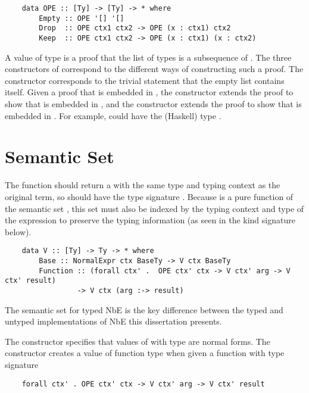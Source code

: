 \begin{lstlisting}
    data OPE :: [Ty] -> [Ty] -> * where
        Empty :: OPE '[] '[]
        Drop  :: OPE ctx1 ctx2 -> OPE (x : ctx1) ctx2
        Keep  :: OPE ctx1 ctx2 -> OPE (x : ctx1) (x : ctx2)
\end{lstlisting}

A value of type  is a proof that the list of types  is a subsequence of . The three constructors of  correspond to the different ways of constructing such a proof. The  constructor corresponds to the trivial statement that the empty list contains itself. Given a proof that  is embedded in , the  constructor extends the proof to show that  is embedded in , and the  constructor extends the proof to show that  is embedded in . For example,  could have the (Haskell) type .



\section{Semantic Set}

The  function should return a  with the same type and typing context as the original term, so should have the type signature . Because  is a pure function of the semantic set , this set must also be indexed by the typing context and type of the expression to preserve the typing information (as seen in the kind signature below). 

\begin{lstlisting}
    data V :: [Ty] -> Ty -> * where 
        Base :: NormalExpr ctx BaseTy -> V ctx BaseTy
        Function :: (forall ctx' .  OPE ctx' ctx -> V ctx' arg -> V ctx' result) 
                 -> V ctx (arg :-> result)
\end{lstlisting}

The semantic set for typed NbE is the key difference between the typed and untyped implementations of NbE this dissertation presents. 


The  constructor specifies that values of  with type  are normal forms. The  constructor creates a value of function type  when given a function with type signature 
\begin{lstlisting}
    forall ctx' . OPE ctx' ctx -> V ctx' arg -> V ctx' result 
\end{lstlisting}

